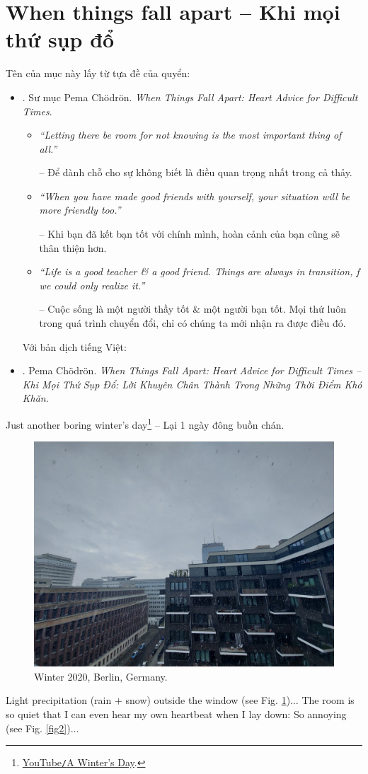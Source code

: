 \documentclass[12pt,oneside]{book}
\begin{document}
\section{When things fall apart -- Khi mọi thứ sụp đổ}
Tên của mục này lấy từ tựa đề của quyển:
\begin{itemize}
	\item \cite{Chodron_fall_apart}. Sư mục {\sc Pema Ch\"odr\"on}. {\it When Things Fall Apart: Heart Advice for Difficult Times}.
	\begin{itemize}
		\item {\it``Letting there be room for not knowing is the most important thing of all.''}
		
		-- Để dành chỗ cho sự không biết là điều quan trọng nhất trong cả thảy.
		
		\item {\it``When you have made good friends with yourself, your situation will be more friendly too.''}
		
		-- Khi bạn đã kết bạn tốt với chính mình, hoàn cảnh của bạn cũng sẽ thân thiện hơn.
		
		\item {\it``Life is a good teacher \& a good friend. Things are always in transition, f we could only realize it.''}
		
		-- Cuộc sống là một người thầy tốt \& một người bạn tốt. Mọi thứ luôn trong quá trình chuyển đổi, chỉ có chúng ta mới nhận ra được điều đó.
	\end{itemize}
	Với bản dịch tiếng Việt:
	\item \cite{Chodron_fall_apart_VN}. {\sc Pema Ch\"odr\"on}. {\it When Things Fall Apart: Heart Advice for Difficult Times -- Khi Mọi Thứ Sụp Đổ: Lời Khuyên Chân Thành Trong Những Thời Điểm Khó Khăn}.
\end{itemize}
Just another boring winter's day\footnote{\href{https://www.youtube.com/watch?v=g1ucAANctmk}{YouTube{\tt/}A Winter's Day}.} -- Lại 1 ngày đông buồn chán.
\begin{figure}[H]
	\centering
	\includegraphics[width = 12cm]{Berlin_winter2020}
	\caption{Winter 2020, Berlin, Germany.}
	\label{fig1}
\end{figure}
Light precipitation (rain $+$ snow) outside the window (see Fig. \ref{fig1})$\ldots$ The room is so quiet that I can even hear my own heartbeat when I lay down: So annoying (see Fig. \ref{fig2})$\ldots$
\end{document}
